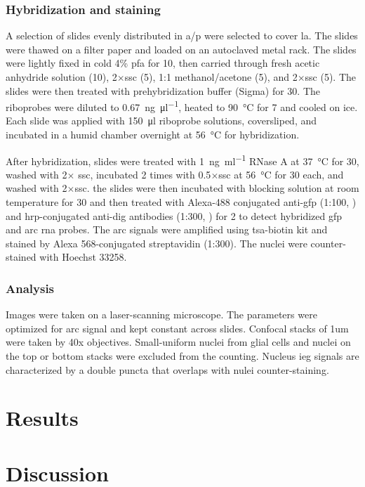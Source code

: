 \subsubsection{Hybridization and staining}
A selection of slides evenly distributed in \gls{a/p} were selected to cover \gls{la}. The slides were thawed on a filter paper and loaded on an autoclaved metal rack. The slides were lightly fixed in cold 4\% \gls{pfa} for \SI{10}{\min}, then carried through fresh acetic anhydride solution (\SI{10}{\min}), 2$\times$\gls{ssc} (\SI{5}{\min}), 1:1 methanol\slash acetone (\SI{5}{\min}), and 2$\times$\gls{ssc} (\SI{5}{\min}). The slides were then treated with prehybridization buffer (Sigma) for \SI{30}{\min}. The riboprobes were diluted to \SI{0.67}{\ng\per\ul}, heated to \SI{90}{\celsius} for \SI{7}{\min} and cooled on ice. Each slide was applied with \SI{150}{\ul} riboprobe solutions, coversliped, and incubated in a humid chamber overnight at \SI{56}{\celsius} for hybridization.

After hybridization, slides were treated with \SI{1}{\ng\per\ml} RNase A at \SI{37}{\celsius} for \SI{30}{\min}, washed with 2$\times$ \gls{ssc}, incubated 2 times with 0.5$\times$\gls{ssc} at \SI{56}{\celsius} for \SI{30}{\min} each, and washed with 2$\times$\gls{ssc}. the slides were then incubated with blocking solution at room temperature for \SI{30}{\min} and then treated with Alexa-488 conjugated anti-\gls{gfp} (1:100, ) and \gls{hrp}-conjugated anti-\gls{dig} antibodies (1:300, ) for \SI{2}{\hr} to detect hybridized \gls{gfp} and \gls{arc} \gls{rna} probes. The \gls{arc} signals were amplified using \gls{tsa}-biotin kit and stained by Alexa 568-conjugated streptavidin (1:300). The nuclei were counter-stained with Hoechst 33258.

\subsubsection{Analysis}
Images were taken on a laser-scanning microscope. The parameters were optimized for \gls{arc} signal and kept constant across slides. Confocal stacks of 1um were taken by 40x objectives. Small-uniform nuclei from glial cells and nuclei on the top or bottom stacks were excluded from the counting. Nucleus \gls{ieg} signals are characterized by a double puncta that overlaps with nulei counter-staining. %

\section{Results}
\section{Discussion}
